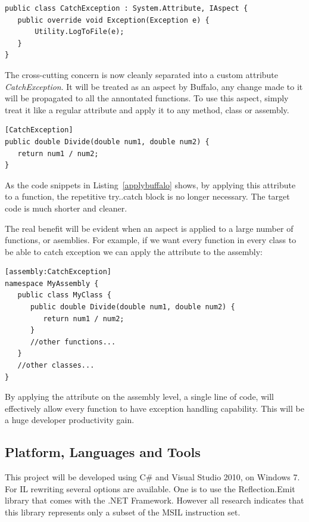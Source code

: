 \begin{lstlisting}[caption={Buffalo aspect}, label=buffalocode]
public class CatchException : System.Attribute, IAspect {
   public override void Exception(Exception e) {
       Utility.LogToFile(e);
   } 
}
\end{lstlisting}

The cross-cutting concern is now cleanly separated into a custom attribute {\em CatchException}. It will be treated as an aspect by Buffalo, any change made to it will be propagated to all the annontated functions. To use this aspect, simply treat it like a regular attribute and apply it to any method, class or assembly.

\begin{lstlisting}[caption={applying Buffalo aspect}, label=applybuffalo]
[CatchException]
public double Divide(double num1, double num2) {
   return num1 / num2;
}
\end{lstlisting}

As the code snippets in Listing~\ref{applybuffalo} shows, by applying this attribute to a function, the repetitive try..catch block is no longer necessary. The target code is much shorter and cleaner. 

The real benefit will be evident when an aspect is applied to a large number of functions, or asemblies. For example, if we want every function in every class to be able to catch exception we can apply the attribute to the assembly:

\begin{lstlisting}[caption={applying Buffalo aspect on an assembly}, label=applybuffaloassembly]
[assembly:CatchException]
namespace MyAssembly {
   public class MyClass {
      public double Divide(double num1, double num2) {
         return num1 / num2;
      }
      //other functions...
   }
   //other classes...
}
\end{lstlisting}

By applying the attribute on the assembly level, a single line of code, will effectively allow every function to have exception handling capability. This will be a huge developer productivity gain.

\subsection{Platform, Languages and Tools}
This project will be developed using C\# and Visual Studio 2010, on Windows 7. For IL rewriting several options are available. One is to use the Reflection.Emit library that comes with the .NET Framework. However all research indicates that this library represents only a subset of the MSIL instruction set.

